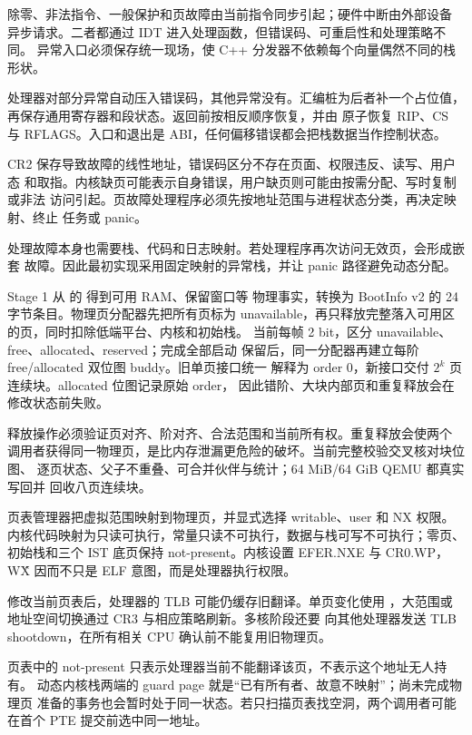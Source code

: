 除零、非法指令、一般保护和页故障由当前指令同步引起；硬件中断由外部设备
异步请求。二者都通过 IDT 进入处理函数，但错误码、可重启性和处理策略不同。
异常入口必须保存统一现场，使 C++ 分发器不依赖每个向量偶然不同的栈形状。

处理器对部分异常自动压入错误码，其他异常没有。汇编桩为后者补一个占位值，
再保存通用寄存器和段状态。返回前按相反顺序恢复，并由  原子恢复
RIP、CS 与 RFLAGS。入口和退出是 ABI，任何偏移错误都会把栈数据当作控制状态。

CR2 保存导致故障的线性地址，错误码区分不存在页面、权限违反、读写、用户态
和取指。内核缺页可能表示自身错误，用户缺页则可能由按需分配、写时复制或非法
访问引起。页故障处理程序必须先按地址范围与进程状态分类，再决定映射、终止
任务或 panic。

处理故障本身也需要栈、代码和日志映射。若处理程序再次访问无效页，会形成嵌套
故障。因此最初实现采用固定映射的异常栈，并让 panic 路径避免动态分配。

Stage 1 从  的  得到可用 RAM、保留窗口等
物理事实，转换为 BootInfo v2 的 24 字节条目。物理页分配器先把所有页标为
unavailable，再只释放完整落入可用区的页，同时扣除低端平台、内核和初始栈。
当前每帧 2 bit，区分 unavailable、free、allocated、reserved；完成全部启动
保留后，同一分配器再建立每阶 free/allocated 双位图 buddy。旧单页接口统一
解释为 order 0，新接口交付 \(2^k\) 页连续块。allocated 位图记录原始 order，
因此错阶、大块内部页和重复释放会在修改状态前失败。

释放操作必须验证页对齐、阶对齐、合法范围和当前所有权。重复释放会使两个
调用者获得同一物理页，是比内存泄漏更危险的破坏。当前完整校验交叉核对块位图、
逐页状态、父子不重叠、可合并伙伴与统计；64 MiB/64 GiB QEMU 都真实写回并
回收八页连续块。

页表管理器把虚拟范围映射到物理页，并显式选择 writable、user 和 NX 权限。
内核代码映射为只读可执行，常量只读不可执行，数据与栈可写不可执行；零页、
初始栈和三个 IST 底页保持 not-present。内核设置 EFER.NXE 与 CR0.WP，
W\^X 因而不只是 ELF 意图，而是处理器执行权限。

修改当前页表后，处理器的 TLB 可能仍缓存旧翻译。单页变化使用
，大范围或地址空间切换通过 CR3 与相应策略刷新。多核阶段还要
向其他处理器发送 TLB shootdown，在所有相关 CPU 确认前不能复用旧物理页。

页表中的 not-present 只表示处理器当前不能翻译该页，不表示这个地址无人持有。
动态内核栈两端的 guard page 就是“已有所有者、故意不映射”；尚未完成物理页
准备的事务也会暂时处于同一状态。若只扫描页表找空洞，两个调用者可能在首个
PTE 提交前选中同一地址。

